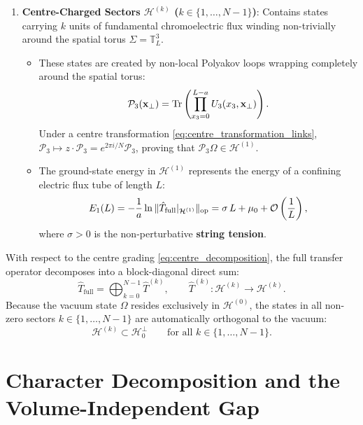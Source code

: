 \begin{enumerate}
    \item \textbf{Centre-Charged Sectors $\mathcal{H}^{(k)}$ ($k \in \{1, \dots, N-1\}$)}:
    Contains states carrying $k$ units of fundamental chromoelectric flux winding non-trivially around the spatial torus $\Sigma = \mathbb{T}_L^3$.
    \begin{itemize}
        \item These states are created by non-local Polyakov loops wrapping completely around the spatial torus:
        \begin{equation}
        \mathcal{P}_3(\mathbf{x}_\perp) = \mathrm{Tr} \left( \prod_{x_3=0}^{L-a} U_3(x_3, \mathbf{x}_\perp) \right).
        \end{equation}
        Under a centre transformation \eqref{eq:centre_transformation_links}, $\mathcal{P}_3 \mapsto z \cdot \mathcal{P}_3 = e^{2\pi i / N} \mathcal{P}_3$, proving that $\mathcal{P}_3 \Omega \in \mathcal{H}^{(1)}$.
        \item The ground-state energy in $\mathcal{H}^{(1)}$ represents the energy of a confining electric flux tube of length $L$:
        \begin{equation}
        E_1(L) = -\frac{1}{a} \ln \|\hat{T}_{\mathrm{full}}|_{\mathcal{H}^{(1)}}\|_{\mathrm{op}} = \sigma \, L + \mu_0 + \mathcal{O}\left( \frac{1}{L} \right),
        \end{equation}
        where $\sigma > 0$ is the non-perturbative \textbf{string tension}.
    \end{itemize}
\end{enumerate}

With respect to the centre grading \eqref{eq:centre_decomposition}, the full transfer operator decomposes into a block-diagonal direct sum:
\begin{equation}
\label{eq:transfer_block_diagonal}
\hat{T}_{\mathrm{full}} = \bigoplus_{k=0}^{N-1} \hat{T}^{(k)}, \qquad \hat{T}^{(k)} : \mathcal{H}^{(k)} \longrightarrow \mathcal{H}^{(k)}.
\end{equation}
Because the vacuum state $\Omega$ resides exclusively in $\mathcal{H}^{(0)}$, the states in all non-zero sectors $k \in \{1, \dots, N-1\}$ are automatically orthogonal to the vacuum:
\begin{equation}
\label{eq:orthogonal_to_vacuum_centre}
\mathcal{H}^{(k)} \subset \mathcal{H}_0^\perp \qquad \text{for all } k \in \{1, \dots, N-1\}.
\end{equation}

\section{Character Decomposition and the Volume-Independent Gap}
\label{sec:character_volume_gap}

